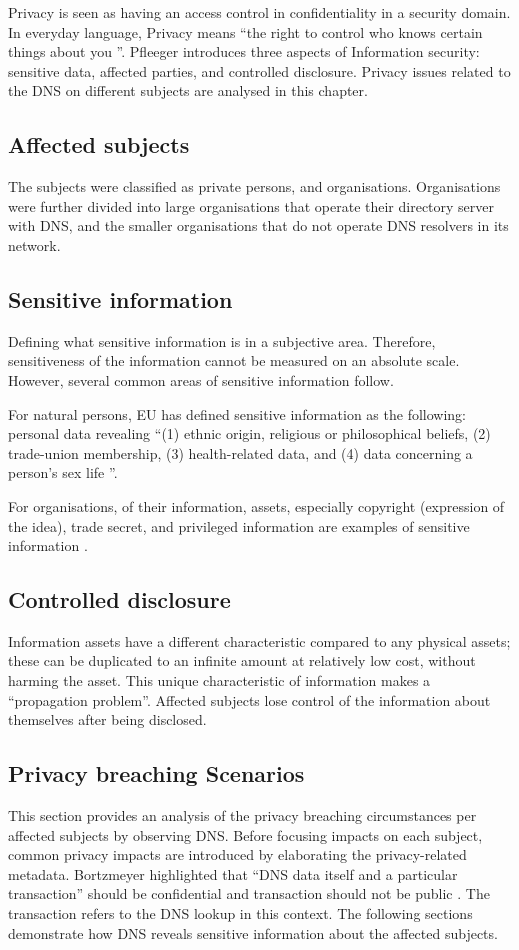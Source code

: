 Privacy is seen as having an access control in confidentiality in a security domain.
In everyday language, Privacy means ``the right to control who knows certain things about you \cite{securityincomputing}''.
Pfleeger introduces three aspects of Information security: sensitive data, affected parties, and controlled disclosure.
Privacy issues related to the DNS on different subjects are analysed in this chapter.

\subsection{Affected subjects}
The subjects were classified as private persons, and organisations. Organisations were further divided into large organisations that operate their directory server with DNS, and the smaller organisations that do not operate DNS resolvers in its network.

\subsection{Sensitive information}\label{sensitiveinformation}
Defining what sensitive information is in a subjective area.
Therefore, sensitiveness of the information cannot be measured on an absolute scale. However, several common areas of sensitive information follow.

For natural persons, EU has defined sensitive information as the following: personal data revealing ``(1) ethnic origin, religious or philosophical beliefs, (2) trade-union membership, (3) health-related data, and (4) data concerning a person's sex life \cite{GDPR}''.

For organisations, of their information, assets, especially copyright (expression of the idea), trade secret, and privileged information are examples of sensitive information \cite{securityincomputing}.

\subsection{Controlled disclosure}
Information assets have a different characteristic compared to any physical assets; these can be duplicated to an infinite amount at relatively low cost, without harming the asset.
This unique characteristic of information makes a ``propagation problem''.
Affected subjects lose control of the information about themselves after being disclosed.

\subsection{Privacy breaching Scenarios}
This section provides an analysis of the privacy breaching circumstances per affected subjects by observing DNS. Before focusing impacts on each subject, common privacy impacts are introduced by elaborating the privacy-related metadata.
Bortzmeyer highlighted that ``DNS data itself and a particular transaction'' should be confidential and transaction should not be public \cite{rfc7626}. The transaction refers to the DNS lookup in this context.
The following sections demonstrate how DNS reveals sensitive information about the affected subjects.

